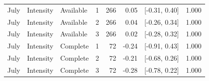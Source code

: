 \begin{longtable}{lllrrrrr}
July & Intensity & Available & 1 & 266 & 0.05 & [-0.31, 0.40] & 1.000 \\
July & Intensity & Available & 2 & 266 & 0.04 & [-0.26, 0.34] & 1.000 \\
July & Intensity & Available & 3 & 266 & 0.02 & [-0.28, 0.32] & 1.000 \\
July & Intensity & Complete & 1 &  72 & -0.24 & [-0.91, 0.43] & 1.000 \\
July & Intensity & Complete & 2 &  72 & -0.21 & [-0.68, 0.26] & 1.000 \\
July & Intensity & Complete & 3 &  72 & -0.28 & [-0.78, 0.22] & 1.000 \\
\end{longtable}
